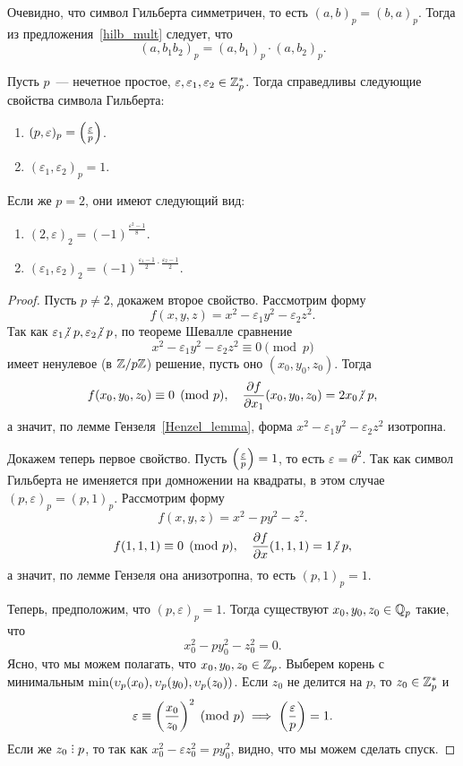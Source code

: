 		\begin{remark}
			Очевидно, что символ Гильберта симметричен, то есть $(a, b)_{p} = (b, a)_{p}$. Тогда из предложения~\ref{hilb_mult} следует, что 
			\[
				(a, b_{1} b_{2})_{p} = (a, b_{1})_{p} \cdot (a, b_{2})_{p}.
			\]
		\end{remark}

		\begin{statement}\label{calc_hilb} 
			Пусть $p$~--- нечетное простое, $\varepsilon, \varepsilon_1, \varepsilon_2 \in \Z_{p}^{*}$. Тогда справедливы следующие свойства символа Гильберта: 
			\begin{enumerate}
				\item $(p, \varepsilon)_{p} = \lr*{\frac{\varepsilon}{p}}$.
				\item $(\varepsilon_1, \varepsilon_2)_{p} = 1$.
			\end{enumerate}
			Если же $p = 2$, они имеют следующий вид: 
			\begin{enumerate}
				\item $(2, \varepsilon)_{2} = (-1)^{\frac{\varepsilon^2 - 1}{8}}$.
				\item $(\varepsilon_1, \varepsilon_2)_{2} = (-1)^{\frac{\varepsilon_1 - 1}{2} \cdot \frac{\varepsilon_2 - 1}{2}}$. 
			\end{enumerate}
		\end{statement}
		\begin{proof}
			Пусть $p \neq 2$, докажем второе свойство. Рассмотрим форму 
			\[
				f(x, y, z) = x^2 - \varepsilon_1 y^2 - \varepsilon_2 z^2. 
			\]
			Так как $\varepsilon_1 \notdivby p, \varepsilon_2 \notdivby p$, по теореме Шевалле сравнение 
			\[
				x^2 - \varepsilon_1 y^2 - \varepsilon_2 z^2 \equiv 0 \pmod{p}
			\]
			имеет ненулевое (в $\Z/p\Z$) решение, пусть оно $(x_0, y_0, z_0)$. Тогда 
			\[
				f(x_0, y_0, z_0) \equiv 0 \pmod{p}, \quad \frac{\partial f}{\partial x_1}(x_0, y_0, z_0) = 2x_0 \notdivby p,
			\]
			а значит, по лемме Гензеля~\ref{Henzel_lemma}, форма $x^2 - \varepsilon_1 y^2 - \varepsilon_2 z^2$ изотропна. 

			Докажем теперь первое свойство. Пусть $\lr*{\frac{\varepsilon}{p}} = 1$, то есть $\varepsilon = \theta^2$. Так как символ Гильберта не именяется при домножении на квадраты, в этом случае $(p, \varepsilon)_{p} = (p, 1)_{p}$. Рассмотрим форму 
			\[
				f(x, y, z) = x^2 - py^2 - z^2.
			\]
			\[
				f(1, 1, 1) \equiv 0 \pmod{p}, \quad \frac{\partial f}{\partial x}(1, 1, 1) = 1 \notdivby p, 
			\] 
			а значит, по лемме Гензеля она анизотропна, то есть $(p, 1)_{p} = 1$. 

			Теперь, предположим, что $(p, \varepsilon)_{p} = 1$. Тогда существуют $x_0, y_0, z_0 \in \Q_{p}$ такие, что 
			\[
				x_0^2 - py_0^2 - z_0^2  = 0.
			\]
			Ясно, что мы можем полагать, что $x_0, y_0, z_0 \in \Z_{p}$. Выберем корень с минимальным $\min(\v_{p}(x_0), \v_{p}(y_0), \v_{p}(z_0))$. Если $z_0$ не делится на $p$, то $z_0 \in \Z_{p}^{*}$ и 
			\[
				\varepsilon \equiv \lr*{\frac{x_0}{z_0}}^2 \pmod{p} \implies \lr*{\frac{\varepsilon}{p}} = 1.
			\]
			Если же $z_0 \divby p$, то так как $x_0^2 - \varepsilon z_0^2 = py_0^2$, видно, что мы можем сделать спуск. 


		\end{proof}

